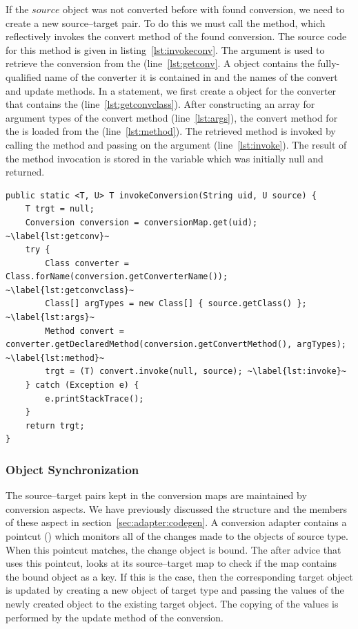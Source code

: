 If the $source$ object was not converted before with found conversion, we need to create a new source--target pair.
To do this we must call the  method, which reflectively invokes the convert method of the found conversion.
The source code for this method is given in listing~\ref{lst:invokeconv}.
The argument  is used to retrieve the conversion from the  (line~\ref{lst:getconv}. A  object contains the fully-qualified name of the converter it is contained in and the names of the convert and update methods. 
In a  statement, we first create a  object for the converter that contains the  (line~\ref{lst:getconvclass}). 
After constructing an array for argument types of the convert method (line~\ref{lst:args}), the convert method for the  is loaded from the  (line~\ref{lst:method}). 
The retrieved method is invoked by calling the  method and passing on the argument  (line~\ref{lst:invoke}).
The result of the method invocation is stored in the variable  which was initially null and returned. 


\begin{lstlisting}[float, caption={The \lstinln{invokeConversion} method which reflectively invokes the convert method of a given conversion}, label={lst:invokeconv}]
public static <T, U> T invokeConversion(String uid, U source) {
	T trgt = null;
	Conversion conversion = conversionMap.get(uid); ~\label{lst:getconv}~
	try {
		Class converter = Class.forName(conversion.getConverterName()); ~\label{lst:getconvclass}~
		Class[] argTypes = new Class[] { source.getClass() }; ~\label{lst:args}~
		Method convert = converter.getDeclaredMethod(conversion.getConvertMethod(), argTypes); ~\label{lst:method}~
		trgt = (T) convert.invoke(null, source); ~\label{lst:invoke}~
	} catch (Exception e) {
		e.printStackTrace();
	}
	return trgt;
}
\end{lstlisting}


\subsubsection{Object Synchronization}
\label{sec:adapter:sync}
The source--target pairs kept in the conversion maps are maintained by conversion aspects. 
We have previously discussed the structure and the members of these aspect in section~\ref{sec:adapter:codegen}.
A conversion adapter contains a pointcut () which monitors all of the changes made to the objects of source type.
When this pointcut matches, the change object is bound. 
The after advice that uses this pointcut, looks at its source--target map to check if the map contains the bound object as a key. 
If this is the case, then the corresponding target object is updated by creating a new object of target type and passing the values of the newly created object to the existing target object. 
The copying of the values is performed by the update method of the conversion.

